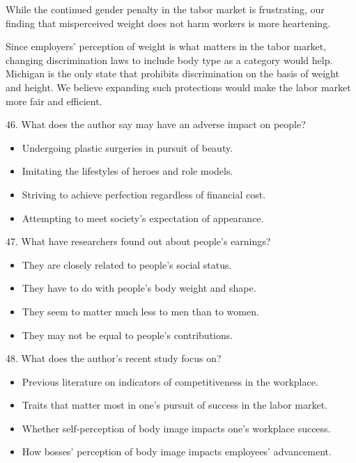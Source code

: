 \documentclass[UTF8,11pt]{ctexart}
\begin{document}
While the continued gender penalty in the tabor market is frustrating, our finding that misperceived weight does not harm workers is more heartening.


Since employers' perception of weight is what matters in the tabor market, changing discrimination laws to include body type as a category would help. Michigan is the only state that prohibits discrimination on the basis of weight and height. We believe expanding such protections would make the labor market more fair and efficient.


46. What does the author say may have an adverse impact on people?


\begin{itemize}[leftmargin=2em,itemsep=.2em,topsep=.4em]\item[A.] Undergoing plastic surgeries in pursuit of beauty.
\item[B.] Imitating the lifestyles of heroes and role models.
\item[C.] Striving to achieve perfection regardless of financial cost.
\item[D.] Attempting to meet society's expectation of appearance.
\end{itemize}

47. What have researchers found out about people's earnings?


\begin{itemize}[leftmargin=2em,itemsep=.2em,topsep=.4em]\item[A.] They are closely related to people's social status.
\item[B.] They have to do with people's body weight and shape.
\item[C.] They seem to matter much less to men than to women.
\item[D.] They may not be equal to people's contributions.
\end{itemize}

48. What does the author's recent study focus on?


\begin{itemize}[leftmargin=2em,itemsep=.2em,topsep=.4em]\item[A.] Previous literature on indicators of competitiveness in the workplace.
\item[B.] Traits that matter most in one's pursuit of success in the labor market.
\item[C.] Whether self-perception of body image impacts one's workplace success.
\item[D.] How bosses' perception of body image impacts employees' advancement.
\end{itemize}
\end{document}
